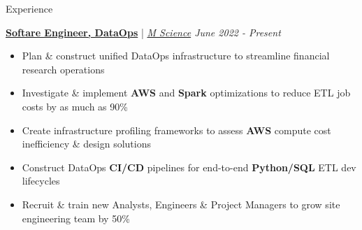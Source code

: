 \documentclass{resume/resume}
\begin{document}
\begin{rSection}{Experience}

  \href{https://www.linkedin.com/posts/m-science-llc_how-m-science-uses-databricks-structured-activity-6953752015013363713-EOTN/}{\bf Softare Engineer, DataOps} | {\em \href{https://mscience.com}{M Science} \hfill June 2022 - Present}
  \vspace{-6pt}
  \begin{itemize}[nosep]
    \item Plan \& construct unified DataOps infrastructure to streamline financial research operations
    \item Investigate \& implement {\bf AWS} and {\bf Spark} optimizations to reduce ETL job costs by as much as 90\%
    \item Create infrastructure profiling frameworks to assess {\bf AWS} compute cost inefficiency \& design solutions
    \item Construct DataOps {\bf CI/CD} pipelines for end-to-end {\bf Python/SQL} ETL dev lifecycles
    \item Recruit \& train new Analysts, Engineers \& Project Managers to grow site engineering team by 50\%
  \end{itemize}
  

\end{rSection}
\end{document}
